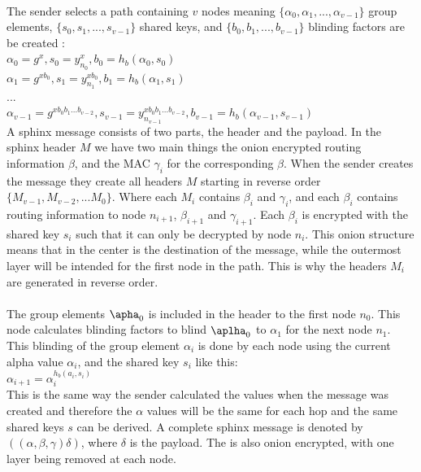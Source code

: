 \documentclass[informationsecurity]{gucmasterproject}
\begin{document}
\paragraph{}
The sender selects a path containing $v$ nodes meaning $ \{\alpha_0, \alpha_1,...,\alpha_{v-1}\} $ group elements, $ \{s_0, s_1,...,s_{v-1}\} $ shared keys, and $ \{b_0, b_1,...,b_{v-1}\} $ blinding factors are be created \cite{danezis2009sphinx}: \\
$\alpha_0 = g^x, s_0 = y_{n_0}^x, b_0 = h_b(\alpha_0, s_0)$ \\
$\alpha_1 = g^{xb_0}, s_1 = y_{n_1}^{xb_0}, b_1 = h_b(\alpha_1, s_1)$ \\
...\\
$\alpha_{v-1} = g^{xb_0b_1...b_{v-2}}, s_{v-1} = y_{n_{v-1}}^{xb_0b_1...b_{v-2}}, b_{v-1} = h_b(\alpha_{v-1}, s_{v-1})$ \\

\noindent A sphinx message consists of two parts, the header and the payload.
In the sphinx header $M$ we have two main things the onion encrypted routing information $\beta$, and the MAC $\gamma_i$ for the corresponding $\beta$. When the sender creates the message they create all headers $M$ starting in reverse order $\{M_{v-1}, M_{v-2},...M_0 \}$. Where each $M_i$ contains $\beta_i$ and $\gamma_i$, and each $\beta_i$ contains routing information to node $n_{i+1}$, $\beta_{i+1}$ and $\gamma_{i+1}$. Each $\beta_i$ is encrypted with the shared key $s_i$ such that it can only be decrypted by node $n_i$. This onion structure means that in the center is the destination of the message, while the outermost layer will be intended for the first node in the path. This is why the headers $M_i$ are generated in reverse order.

\paragraph{}
The group elements $\apha_0$ is included in the header to the first node $n_0$. This node calculates blinding factors to blind $\aplha_0$ to $\alpha_1$ for the next node $n_1$. This blinding of the group element $\alpha_i$ is done by each node using the current alpha value $\alpha_i$, and the shared key $s_i$ like this:\\
$\alpha_{i+1} = \alpha_i^{h_b(a_i,s_i)}$ \\
This is the same way the sender calculated the values when the message was created and therefore the $\alpha$ values will be the same for each hop and the same shared keys $s$ can be derived. A complete sphinx message is denoted by $((\alpha, \beta, \gamma)\delta)$, where $\delta$ is the payload. The is also onion encrypted, with one layer being removed at each node. 
\end{document}
